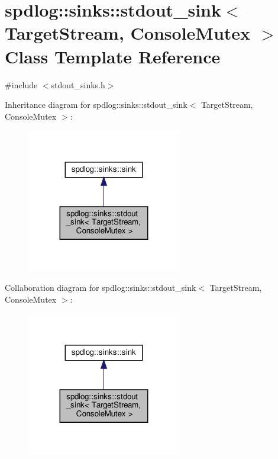 \hypertarget{classspdlog_1_1sinks_1_1stdout__sink}{}\section{spdlog\+:\+:sinks\+:\+:stdout\+\_\+sink$<$ Target\+Stream, Console\+Mutex $>$ Class Template Reference}
\label{classspdlog_1_1sinks_1_1stdout__sink}


{\ttfamily \#include $<$stdout\+\_\+sinks.\+h$>$}



Inheritance diagram for spdlog\+:\+:sinks\+:\+:stdout\+\_\+sink$<$ Target\+Stream, Console\+Mutex $>$\+:
\nopagebreak
\begin{figure}[H]
\begin{center}
\leavevmode
\includegraphics[width=191pt]{classspdlog_1_1sinks_1_1stdout__sink__inherit__graph}
\end{center}
\end{figure}


Collaboration diagram for spdlog\+:\+:sinks\+:\+:stdout\+\_\+sink$<$ Target\+Stream, Console\+Mutex $>$\+:
\nopagebreak
\begin{figure}[H]
\begin{center}
\leavevmode
\includegraphics[width=191pt]{classspdlog_1_1sinks_1_1stdout__sink__coll__graph}
\end{center}
\end{figure}
